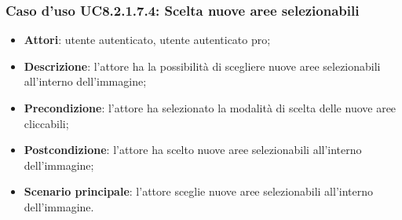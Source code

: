 \subsubsection{Caso d'uso UC8.2.1.7.4: Scelta nuove aree selezionabili}
\begin{itemize}
	\item \textbf{Attori}: utente autenticato, utente autenticato pro;
	\item \textbf{Descrizione}: l'attore ha la possibilità di scegliere nuove aree selezionabili all'interno dell'immagine;
	\item \textbf{Precondizione}: l'attore ha selezionato la modalità di scelta delle nuove aree cliccabili; 
	\item \textbf{Postcondizione}: l'attore ha scelto nuove aree selezionabili all'interno dell'immagine;
	\item \textbf{Scenario principale}: l'attore sceglie nuove aree selezionabili all'interno dell'immagine. 	
\end{itemize}

